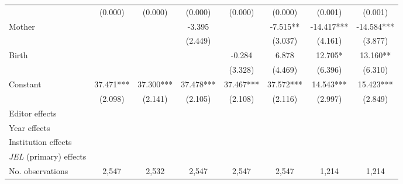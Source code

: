 \begin{table}[H]
\begin{adjustwidth}{-0.085cm}{}
\begin{threeparttable}
\begin{tabular}{p{2.64cm}SSSSSSS}
                                          &     (0.000)   &     (0.000)   &     (0.000)   &     (0.000)   &     (0.000)   &     (0.001)   &     (0.001)   \\
            Mother                        &               &               &      -3.395   &               &      -7.515** &     -14.417***&     -14.584***\\
                                          &               &               &     (2.449)   &               &     (3.037)   &     (4.161)   &     (3.877)   \\
            Birth                         &               &               &               &      -0.284   &       6.878   &      12.705*  &      13.160** \\
                                          &               &               &               &     (3.328)   &     (4.469)   &     (6.396)   &     (6.310)   \\
            Constant                      &      37.471***&      37.300***&      37.478***&      37.467***&      37.572***&      14.543***&      15.423***\\
                                          &     (2.098)   &     (2.141)   &     (2.105)   &     (2.108)   &     (2.116)   &     (2.997)   &     (2.849)   \\
            \midrule
            Editor effects                &           {}   &           {}   &           {}   &           {}   &           {}   &           {}   &           {}   \\
            Year effects                  &           {}   &           {}   &           {}   &           {}   &           {}   &           {}   &           {}   \\
            Institution effects           &           {}   &           {}   &           {}   &           {}   &           {}   &           {}   &           {}   \\
            \textit{JEL} (primary) effects&               &               &               &               &               &               &           {}   \\
            No. observations              &       2,547   &       2,532   &       2,547   &       2,547   &       2,547   &       1,214   &       1,214   \\

\end{tabular}
\end{threeparttable}
\end{adjustwidth}
\end{table}
